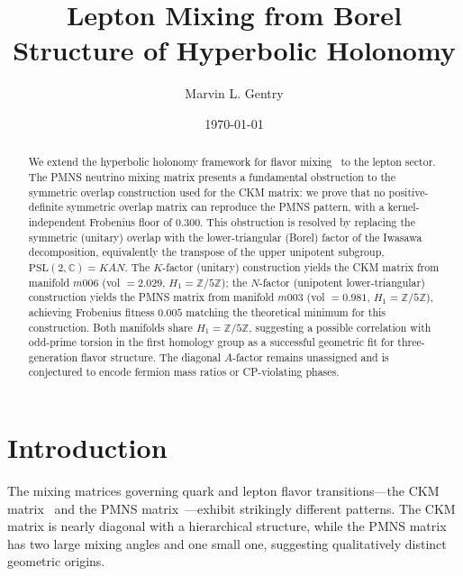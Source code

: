 \documentclass[11pt,a4paper]{article}
\newcommand{\PSL}{\mathrm{PSL}(2,\mathbb{C})}
\newcommand{\Zfive}{\mathbb{Z}/5\mathbb{Z}}
\begin{document}
\title{Lepton Mixing from Borel Structure of Hyperbolic Holonomy}

\author[1]{Marvin L. Gentry}
\date{\today}


\begin{abstract}
We extend the hyperbolic holonomy framework for flavor mixing~\cite{Gentry:CKM}
to the lepton sector. The PMNS neutrino mixing matrix presents a fundamental
obstruction to the symmetric overlap construction used for the CKM matrix:
we prove that no positive-definite symmetric overlap matrix can reproduce the
PMNS pattern, with a kernel-independent Frobenius floor of $0.300$.
This obstruction is resolved by replacing the symmetric (unitary) overlap
with the lower-triangular (Borel) factor of the Iwasawa decomposition, equivalently the transpose of the upper unipotent subgroup,
$\PSL = KAN$. The $K$-factor (unitary) construction yields the CKM matrix
from manifold $m006$ (vol $= 2.029$, $H_1 = \Zfive$); the $N$-factor
(unipotent lower-triangular) construction yields the PMNS matrix from
manifold $m003$ (vol $= 0.981$, $H_1 = \Zfive$), achieving Frobenius
fitness $0.005$ matching the theoretical minimum for this construction.
Both manifolds share $H_1 = \Zfive$, suggesting a possible correlation with odd-prime torsion in the
first homology group as a successful geometric fit for three-generation
flavor structure. The diagonal $A$-factor remains unassigned and is
conjectured to encode fermion mass ratios or CP-violating phases.
\end{abstract}


\maketitle

\section{Introduction}
\label{sec:intro}

The mixing matrices governing quark and lepton flavor transitions---the
CKM matrix~\cite{Cabibbo:1963yz,Kobayashi:1973fv} and the PMNS
matrix~\cite{Pontecorvo:1957cp,Maki:1962mu}---exhibit strikingly different
patterns. The CKM matrix is nearly diagonal with a hierarchical structure,
while the PMNS matrix has two large mixing angles and one small one,
suggesting qualitatively distinct geometric origins.
\end{document}
